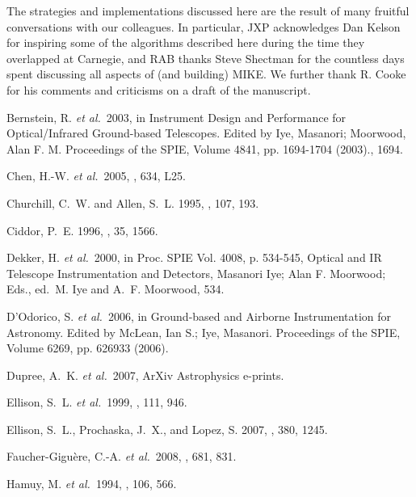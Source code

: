 \documentclass[]{emulateapj}
\begin{document}
\acknowledgments
The strategies and implementations discussed here are the result 
of many fruitful conversations with our colleagues.  In particular, 
JXP acknowledges Dan Kelson for inspiring some of the algorithms
described here during the time they overlapped at Carnegie, and RAB
thanks Steve Shectman for the countless days spent discussing all
aspects of (and building) MIKE.  We further thank R. Cooke for his 
comments and criticisms on a draft of the manuscript.


\begin{thebibliography}{}

{Bernstein}, R. {\it et al.}\  2003, in { Instrument Design and Performance for
  Optical/Infrared Ground-based Telescopes. Edited by Iye, Masanori; Moorwood,
  Alan F. M. Proceedings of the SPIE, Volume 4841, pp. 1694-1704 (2003).},
  1694.

{Chen}, H.-W. {\it et al.}\  2005, \apjl, 634, L25.

{Churchill}, C.~W. and {Allen}, S.~L. 1995, \pasp, 107, 193.

{Ciddor}, P.~E. 1996, \ao, 35, 1566.

{Dekker}, H. {\it et al.}\  2000, in { Proc. SPIE Vol. 4008, p. 534-545,
  Optical and IR Telescope Instrumentation and Detectors, Masanori Iye; Alan F.
  Moorwood; Eds.}, ed.\ M. {Iye} and A.~F. {Moorwood}, 534.

{D'Odorico}, S. {\it et al.}\  2006, in { Ground-based and Airborne
  Instrumentation for Astronomy. Edited by McLean, Ian S.; Iye, Masanori.
  Proceedings of the SPIE, Volume 6269, pp. 626933 (2006).}

{Dupree}, A.~K. {\it et al.}\  2007, ArXiv Astrophysics e-prints.

{Ellison}, S.~L. {\it et al.}\  1999, \pasp, 111, 946.

{Ellison}, S.~L., {Prochaska}, J.~X., and {Lopez}, S. 2007, \mnras, 380, 1245.

{Faucher-Gigu{\`e}re}, C.-A. {\it et al.}\  2008, \apj, 681, 831.

{Hamuy}, M. {\it et al.}\  1994, \pasp, 106, 566.


\end{thebibliography}
\end{document}
